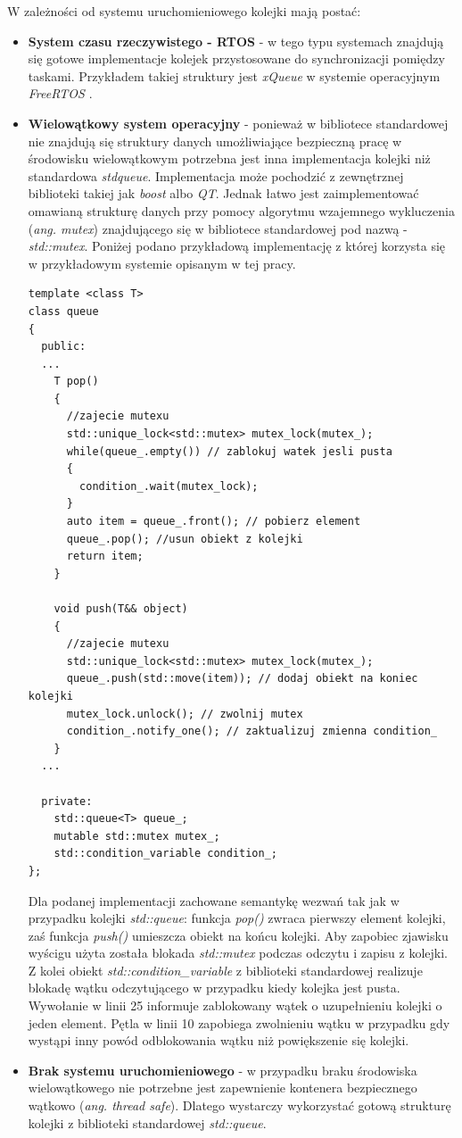 W zależności od systemu uruchomieniowego kolejki mają postać:
\begin{itemize}
\item{\textbf{System czasu rzeczywistego - RTOS}} - w tego typu systemach znajdują się gotowe implementacje kolejek przystosowane do synchronizacji pomiędzy taskami. Przykładem takiej struktury jest \textit{xQueue} w systemie operacyjnym \textit{FreeRTOS} \cite{freertos}.
\item{\textbf{Wielowątkowy system operacyjny}} - ponieważ w bibliotece standardowej nie znajdują się struktury danych umożliwiające bezpieczną pracę w środowisku wielowątkowym potrzebna jest inna implementacja kolejki niż standardowa \textit{stdqueue}. Implementacja może pochodzić z zewnętrznej biblioteki takiej jak \textit{boost} albo \textit{QT}. Jednak łatwo jest zaimplementować omawianą strukturę danych przy pomocy algorytmu wzajemnego wykluczenia (\textit{ang. mutex}) znajdującego się w bibliotece standardowej pod nazwą - \textit{std::mutex}. Poniżej podano przykładową implementację z której korzysta się w przykładowym systemie opisanym w tej pracy.
\begin{lstlisting}[style=lst:cpp, caption=bezpieczna wątkowo kolejka\label{lst:queue}]
template <class T>
class queue
{
  public:
  ...
    T pop()
    {
      //zajecie mutexu
      std::unique_lock<std::mutex> mutex_lock(mutex_);
      while(queue_.empty()) // zablokuj watek jesli pusta
      {
        condition_.wait(mutex_lock);
      }
      auto item = queue_.front(); // pobierz element
      queue_.pop(); //usun obiekt z kolejki
      return item;
    }

    void push(T&& object)
    {
      //zajecie mutexu
      std::unique_lock<std::mutex> mutex_lock(mutex_);
      queue_.push(std::move(item)); // dodaj obiekt na koniec kolejki
      mutex_lock.unlock(); // zwolnij mutex
      condition_.notify_one(); // zaktualizuj zmienna condition_
    }
  ...

  private:
    std::queue<T> queue_;
    mutable std::mutex mutex_;
    std::condition_variable condition_;
};
\end{lstlisting}

Dla podanej implementacji zachowane semantykę wezwań tak jak w przypadku kolejki \textit{std::queue}: funkcja \textit{pop()} zwraca pierwszy element kolejki, zaś funkcja \textit{push()} umieszcza obiekt na końcu kolejki. Aby zapobiec zjawisku wyścigu użyta została blokada \textit{std::mutex} podczas odczytu i zapisu z kolejki. Z kolei obiekt \textit{std::condition\_variable} z biblioteki standardowej realizuje blokadę wątku odczytującego w przypadku kiedy kolejka jest pusta. Wywołanie w linii 25 informuje zablokowany wątek o uzupełnieniu kolejki o jeden element. Pętla w linii 10 zapobiega zwolnieniu wątku w przypadku gdy wystąpi inny powód odblokowania wątku niż powiększenie się kolejki.

\item{\textbf{Brak systemu uruchomieniowego}} - w przypadku braku środowiska wielowątkowego nie potrzebne jest zapewnienie kontenera bezpiecznego wątkowo (\textit{ang. thread safe}). Dlatego wystarczy wykorzystać gotową strukturę kolejki z biblioteki standardowej \textit{std::queue}.
\end{itemize}

